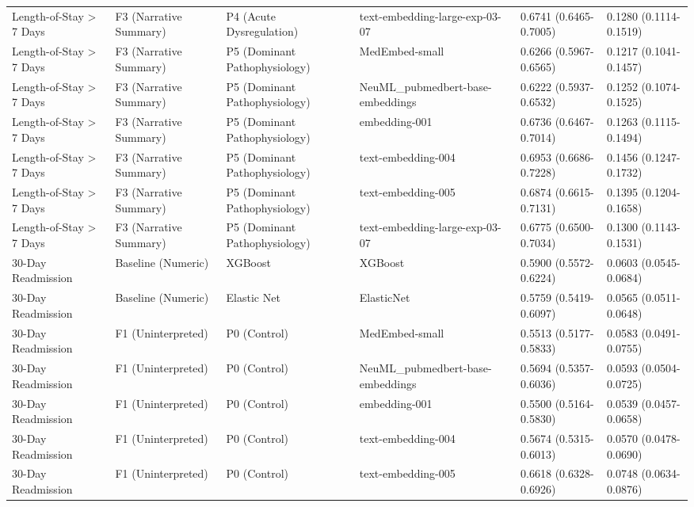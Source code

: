 \begin{tabular}{llllll}
Length-of-Stay \textgreater{} 7 Days & F3 (Narrative Summary) & P4 (Acute Dysregulation) & text-embedding-large-exp-03-07 & 0.6741 (0.6465-0.7005) & 0.1280 (0.1114-0.1519) \\
Length-of-Stay \textgreater{} 7 Days & F3 (Narrative Summary) & P5 (Dominant Pathophysiology) & MedEmbed-small & 0.6266 (0.5967-0.6565) & 0.1217 (0.1041-0.1457) \\
Length-of-Stay \textgreater{} 7 Days & F3 (Narrative Summary) & P5 (Dominant Pathophysiology) & NeuML\_pubmedbert-base-embeddings & 0.6222 (0.5937-0.6532) & 0.1252 (0.1074-0.1525) \\
Length-of-Stay \textgreater{} 7 Days & F3 (Narrative Summary) & P5 (Dominant Pathophysiology) & embedding-001 & 0.6736 (0.6467-0.7014) & 0.1263 (0.1115-0.1494) \\
Length-of-Stay \textgreater{} 7 Days & F3 (Narrative Summary) & P5 (Dominant Pathophysiology) & text-embedding-004 & 0.6953 (0.6686-0.7228) & 0.1456 (0.1247-0.1732) \\
Length-of-Stay \textgreater{} 7 Days & F3 (Narrative Summary) & P5 (Dominant Pathophysiology) & text-embedding-005 & 0.6874 (0.6615-0.7131) & 0.1395 (0.1204-0.1658) \\
Length-of-Stay \textgreater{} 7 Days & F3 (Narrative Summary) & P5 (Dominant Pathophysiology) & text-embedding-large-exp-03-07 & 0.6775 (0.6500-0.7034) & 0.1300 (0.1143-0.1531) \\
30-Day Readmission & Baseline (Numeric) & XGBoost & XGBoost & 0.5900 (0.5572-0.6224) & 0.0603 (0.0545-0.0684) \\
30-Day Readmission & Baseline (Numeric) & Elastic Net & ElasticNet & 0.5759 (0.5419-0.6097) & 0.0565 (0.0511-0.0648) \\
30-Day Readmission & F1 (Uninterpreted) & P0 (Control) & MedEmbed-small & 0.5513 (0.5177-0.5833) & 0.0583 (0.0491-0.0755) \\
30-Day Readmission & F1 (Uninterpreted) & P0 (Control) & NeuML\_pubmedbert-base-embeddings & 0.5694 (0.5357-0.6036) & 0.0593 (0.0504-0.0725) \\
30-Day Readmission & F1 (Uninterpreted) & P0 (Control) & embedding-001 & 0.5500 (0.5164-0.5830) & 0.0539 (0.0457-0.0658) \\
30-Day Readmission & F1 (Uninterpreted) & P0 (Control) & text-embedding-004 & 0.5674 (0.5315-0.6013) & 0.0570 (0.0478-0.0690) \\
30-Day Readmission & F1 (Uninterpreted) & P0 (Control) & text-embedding-005 & 0.6618 (0.6328-0.6926) & 0.0748 (0.0634-0.0876) \\

\end{tabular}
